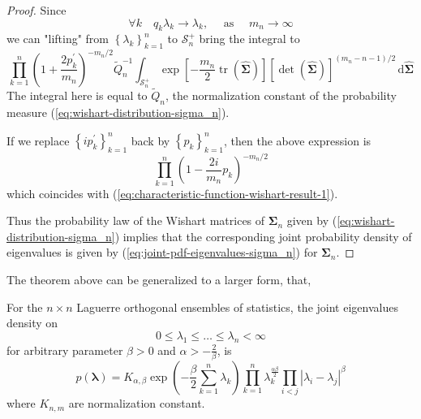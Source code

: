 \begin{proof}
    Since
    \begin{equation*}
        \forall k\quad q_{k}\lambda_{k}\rightarrow\lambda_{k},\quad\text{ as }\quad m_{n}\rightarrow\infty
    \end{equation*}
    we can "lifting" from $\left\{\lambda_{k}\right\}_{k=1}^{n}$ to $\mathcal{S}_{n}^{+}$ bring the integral to
    \begin{equation*}
        \prod_{k=1}^{n}\left(1+\frac{2p_{k}^{\prime}}{m_{n}}\right)^{-m_{n}/2}\widetilde{Q}_{n}^{-1}\int_{\mathcal{S}_{n}^{+}}\exp\left[-\frac{m_{n}}{2}\operatorname{tr}\left(\widehat{\boldsymbol{\Sigma}}\right)\right]\left[\operatorname{det}\left(\widehat{\boldsymbol{\Sigma}}\right)\right]^{(m_{n}-n-1)/2}\,\mathrm{d}\widehat{\boldsymbol{\Sigma}}
    \end{equation*}
    The integral here is equal to $\widetilde{Q}_{n}$, the normalization constant of the probability measure (\ref{eq:wishart-distribution-sigma_n}).

    If we replace $\left\{i p_{k}^{\prime}\right\}_{k=1}^{n}$ back by $\left\{p_{k}\right\}_{k=1}^{n}$, then the above expression is
    \begin{equation*}
        \prod_{k=1}^{n}\left(1-\frac{2i}{m_n}p_{k}\right)^{-m_{n}/2}
    \end{equation*}
    which coincides with (\ref{eq:characteristic-function-wishart-result-1}).

    Thus the probability law of the Wishart matrices of $\boldsymbol{\Sigma}_n$ given by (\ref{eq:wishart-distribution-sigma_n}) implies that the corresponding joint probability density of eigenvalues is given by (\ref{eq:joint-pdf-eigenvalues-sigma_n}) for $\boldsymbol{\Sigma}_n$.
\end{proof}

The theorem above can be generalized to a larger form, that,
\begin{definition}
    For the $n\times n$ Laguerre orthogonal ensembles of statistics, the joint eigenvalues density on
    \begin{equation*}
        0\leq\lambda_{1}\leq\ldots\leq\lambda_{n}<\infty
    \end{equation*}
    for arbitrary parameter $\beta>0$ and $\alpha>-\frac{2}{\beta}$, is
    \begin{equation}
        p\left(\boldsymbol{\lambda}\right)=K_{\alpha,\beta}\exp\left(-\frac{\beta}{2}\sum_{k=1}^{n}\lambda_{k}\right)\prod_{k=1}^{n} \lambda_{k}^{\frac{\alpha\beta}{2}}\prod_{i<j}\left|\lambda_{i}-\lambda_{j}\right|^{\beta}
        \label{eq:laguerre-orthogonal-ensemble}
    \end{equation}
    where $K_{n,m}$ are normalization constant.
\end{definition}

